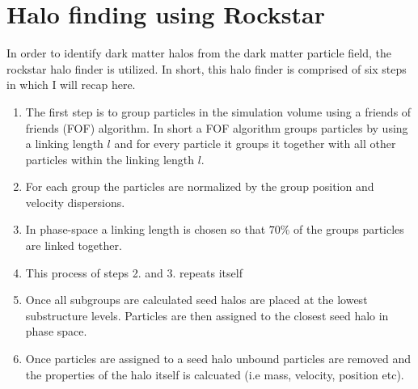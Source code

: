 \section{Halo finding using Rockstar}
In order to identify dark matter halos from the dark matter particle field, the rockstar halo finder\cite{rockstar} is utilized. In short, this halo finder is comprised of six steps in which I will recap here.
\begin{enumerate}
    \item The first step is to group particles in the simulation volume using a friends of friends (FOF) algorithm. In short a FOF algorithm groups particles by using a linking length $l$ and for every particle it groups it together with all other particles within the linking length $l$.
    \item For each group the particles are normalized by the group position and velocity dispersions.
    \item In phase-space a linking length is chosen so that $70$\% of the groups particles are linked together.
    \item This process of steps 2. and 3. repeats itself
    \item Once all subgroups are calculated seed halos are placed at the lowest substructure levels. Particles are then assigned to the closest seed halo in phase space.
    \item Once particles are assigned to a seed halo unbound particles are removed and the properties of the halo itself is calcuated (i.e mass, velocity, position etc).
\end{enumerate}
